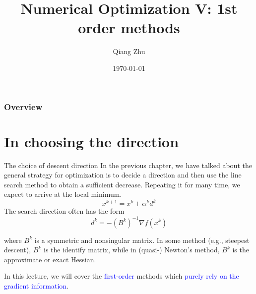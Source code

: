 \documentclass{beamer}
\title[Gradient Descent]{Numerical Optimization V: 1st order methods} %
\author{Qiang Zhu} %
\institute[University of Nevada Las Vegas] %
{
University of Nevada Las Vegas\\ %
\medskip
}
\date{\today} %
\begin{document}
\begin{frame}
\titlepage %
\end{frame}

\begin{frame}
\frametitle{Overview} %
\tableofcontents %
\end{frame}



\section{In choosing the direction}
\begin{frame}{The choice of descent direction}
In the previous chapter, we have talked about the general strategy for optimization is to decide a direction and then use the line search method to obtain a sufficient decrease. Repeating it for many time, we expect to arrive at the local minimum.
\begin{equation*}
    x^{k+1} = x^k + \alpha^k d^k
\end{equation*} 
The search direction often has the form
\begin{equation}
		d^k = -(B^k)^{-1} \nabla f(x^k)
\end{equation}

where $B^k$ is a symmetric and nonsingular matrix. In some method (e.g., steepest descent), $B^k$ is the identify matrix, while in (quasi-) Newton's method, $B^k$ is the approximate or exact Hessian. 

In this lecture, we will cover the \textcolor{blue}{first-order} methods which \textcolor{blue}{purely rely on the gradient information}.

\end{frame}
\end{document}
